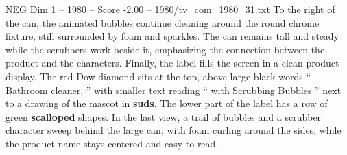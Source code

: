 \begin{textsample}{NEG Dim 1 – 1980 – Score -2.00 – 1980/tv\_com\_1980\_31.txt}
To the right of the can, the animated bubbles continue cleaning around the round chrome fixture, still surrounded by foam and sparkles.
The can remains tall and steady while the scrubbers work beside it, emphasizing the connection between the product and the characters.
Finally, the label fills the screen in a clean product display.
The red Dow diamond sits at the top, above large black words “ Bathroom cleaner, ” with smaller text reading “ with Scrubbing Bubbles ” next to a drawing of the mascot in \textbf{suds}.
The lower part of the label has a row of green \textbf{scalloped} shapes.
In the last view, a trail of bubbles and a scrubber character sweep behind the large can, with foam curling around the sides, while the product name stays centered and easy to read.

\end{textsample}
